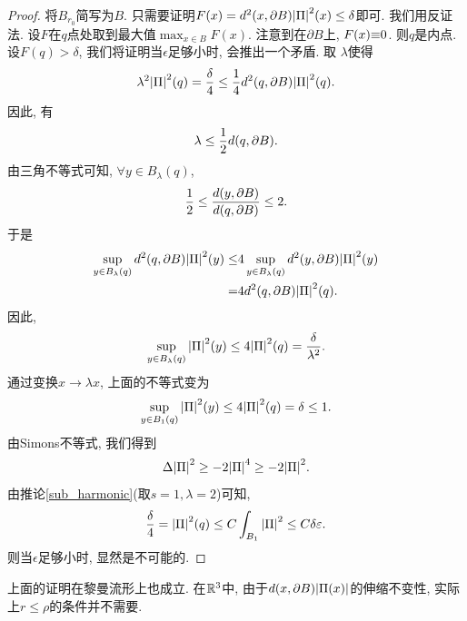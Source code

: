 \begin{proof}
    将$B_{r_0}$简写为$B$. 只需要证明$F(x)=d^2(x,\P B)\abs{\II}^2(x) \le \delta$即可. 我们用反证法. 设$F$在$q$点处取到最大值$\max_{x \in B}F(x)$. 注意到在$\partial B$上, $F(x) \eq 0$. 则$q$是内点.  设$F(q) > \delta$, 我们将证明当$\epsilon$足够小时, 会推出一个矛盾. 取 $\lambda$使得
    \begin{equation}
        \lambda^2\abs{\II}^2(q)=\frac{\delta}{4} \le \frac{1}{4} d^2(q,\P B)\abs{\II}^2(q).
    \end{equation}
    因此, 有
    \begin{equation}
        \lambda \le \frac{1}{2}d(q,\P B).
    \end{equation}
    由三角不等式可知,  $\forall y \in B_\lambda(q)$,
    \begin{equation}
        \frac{1}{2} \le \frac{d(y,\P B)}{d(q,\P B)} \le 2.
    \end{equation}
    于是
    \begin{equation}
        \begin{split}
            \sup_{y\in B_\lambda(q)} d^2(q,\P B) \abs{\II}^2(y) \le &4\sup_{y\in B_\lambda(q)}d^2(y,\P B)\abs{\II}^2(y) \\
            =& 4d^2(q,\P B) \abs{\II}^2(q).
        \end{split}
    \end{equation}
    因此,
    \begin{equation}
        \sup_{y \in B_\lambda(q)} \abs{\II}^2(y) \le 4\abs{\II}^2(q)=\frac{\delta}{\lambda^2}.
    \end{equation}
    通过变换$x\to \lambda x$, 上面的不等式变为
    \begin{equation} \label{ii_sup}
        \sup_{y \in B_1(q)} \abs{\II}^2(y) \le 4\abs{\II}^2(q)=\delta \le 1.
    \end{equation}
    由Simons不等式, 我们得到
    \begin{equation}
        \Delta \abs{\II}^2 \ge -2\abs{\II}^4 \ge -2 \abs{\II}^2.
    \end{equation}
    由推论\eqref{sub_harmonic}(取$s=1,\lambda=2$)可知,
    \begin{equation}
        \frac{\delta}{4}=\abs{\II}^2(q) \le C \int_{B_1} \abs{\II}^2 \le C\delta\epsilon.
    \end{equation}
    则当$\epsilon$足够小时, 显然是不可能的.
\end{proof}
\begin{remark}
    上面的证明在黎曼流形上也成立.  在$\R^3$中, 由于$d(x,\P B)\abs{\II(x)}$的伸缩不变性, 实际上$r \le \rho$的条件并不需要.
\end{remark}
